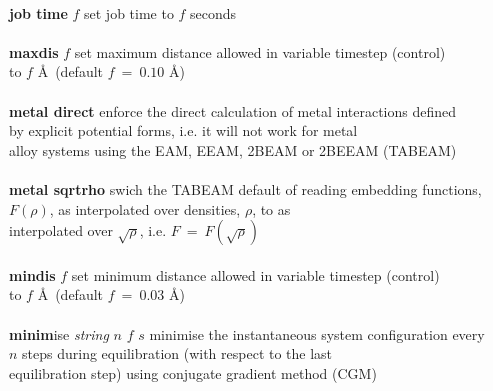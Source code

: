 \begin{tabbing}
\>                                              \> \\
\> {\bf job time} $f$                           \> set job time to $f$ seconds \\
\>                                              \> \\
\> {\bf maxdis} $f$                             \> set maximum distance allowed in variable timestep (control) \\
\>                                              \> to $f$ \AA~(default $f~=~0.10$ \AA) \\
\>                                              \> \\
\> {\bf metal direct}                           \> enforce the direct calculation of metal interactions defined \\
\>                                              \> by explicit potential forms, i.e. it will not work for metal \\
\>                                              \> alloy systems using the EAM, EEAM, 2BEAM or 2BEEAM (TABEAM) \\
\>                                              \> \\
\> {\bf metal sqrtrho}                          \> swich the TABEAM default of reading embedding functions, \\
\>                                              \> $F(\rho)$, as interpolated over densities, $\rho$, to as \\
\>                                              \> interpolated over $\sqrt{\rho}$, i.e. $F~=~F(\sqrt{\rho})$\\
\>                                              \> \\
\> {\bf mindis} $f$                             \> set minimum distance allowed in variable timestep (control) \\
\>                                              \> to $f$ \AA~(default $f~=~0.03$ \AA) \\
\>                                              \> \\
\> {\bf minim}ise {\em string} $n$ $f$ $s$      \> minimise the instantaneous system configuration every \\
\>                                              \> $n$ steps during equilibration (with respect to the last \\
\>                                              \> equilibration step) using conjugate gradient method (CGM) \\

\end{tabbing}

